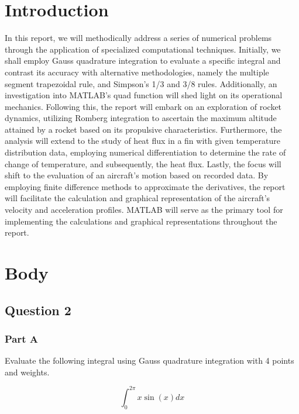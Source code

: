\documentclass[12pt, a4paper]{article}
\numberwithin{equation}{section}
\begin{document}


\newpage
    \renewcommand{\contentsname}{Table of Contents}
    \tableofcontents
    \listoffigures
    \listoftables
\newpage

\section{Introduction}
In this report, we will methodically address a series of numerical problems through the application of specialized computational techniques. Initially, we shall employ Gauss quadrature integration to evaluate a specific integral and contrast its accuracy with alternative methodologies, namely the multiple segment trapezoidal rule, and Simpson’s 1/3 and 3/8 rules. Additionally, an investigation into MATLAB's quad function will shed light on its operational mechanics. Following this, the report will embark on an exploration of rocket dynamics, utilizing Romberg integration to ascertain the maximum altitude attained by a rocket based on its propulsive characteristics. Furthermore, the analysis will extend to the study of heat flux in a fin with given temperature distribution data, employing numerical differentiation to determine the rate of change of temperature, and subsequently, the heat flux. Lastly, the focus will shift to the evaluation of an aircraft's motion based on recorded data. By employing finite difference methods to approximate the derivatives, the report will facilitate the calculation and graphical representation of the aircraft’s velocity and acceleration profiles. MATLAB will serve as the primary tool for implementing the calculations and graphical representations throughout the report.

\section{Body}
\subsection{Question 2}


\subsubsection{Part A}

Evaluate the following integral using Gauss quadrature integration with 4 points and weights.


\begin{equation}
\int_{0}^{2\pi} x \sin(x) dx
\end{equation}
\end{document}
